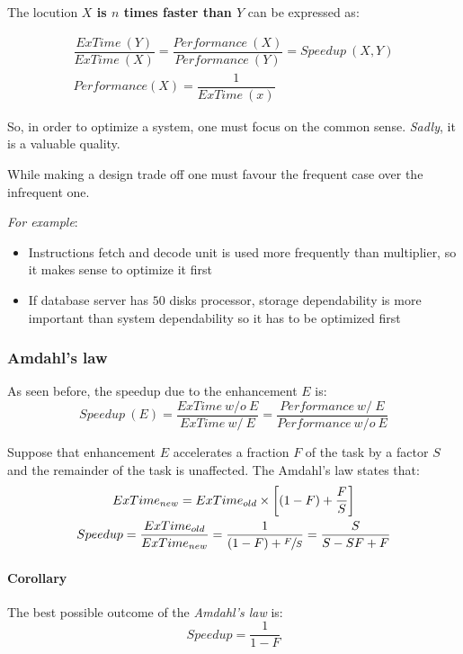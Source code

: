 \documentclass[english]{article}
\begin{document}
\bigskip
The locution \textbf{\(X\) is \(n\) times faster than \(Y\)} can be expressed as:

\begin{gather*}
  \dfrac{ExTime\ (Y)}{ExTime\ (X)}  = \dfrac{Performance\ (X)}{Performance\ (Y)} = Speedup\ (X, Y) \\
  Performance(X) = \dfrac{1}{ExTime\ (x)}
\end{gather*}

So, in order to optimize a system, one must focus on the common sense.
\textit{Sadly}, it is a valuable quality.

While making a design trade off one must favour the frequent case over the infrequent one.

\textit{For example}:
\begin{itemize}
  \item Instructions fetch and decode unit is used more frequently than multiplier, so it makes sense to optimize it first
  \item If database server has \(50\) disks processor, storage dependability is more important than system dependability so it has to be optimized first
\end{itemize}

\subsubsection{Amdahl's law}

As seen before, the speedup due to the enhancement \(E\) is:
\[ Speedup\ (E)  = \dfrac{ExTime\ w/o\ E}{ExTime\ w/\ E} = \dfrac{Performance\ w/\ E}{Performance\ w/o\ E} \]

Suppose that enhancement \(E\) accelerates a fraction \(F\) of the task by a factor \(S\) and the remainder of the task is unaffected.
The Amdahl's law states that:
\begin{gather*}
  ExTime_{new} = ExTime_{old} \times \left[\left(1 - F\right) + \dfrac{F}{S}\right] \\
  Speedup = \dfrac{ExTime_{old}}{ExTime_{new}} = \dfrac{1}{(1 - F) + \sfrac{F}{S}} = \dfrac{S}{S - SF + F}
\end{gather*}

\paragraph{Corollary}

The best possible outcome of the \textit{Amdahl's law} is:
\[ Speedup = \dfrac{1}{1 - F} \]
\end{document}
